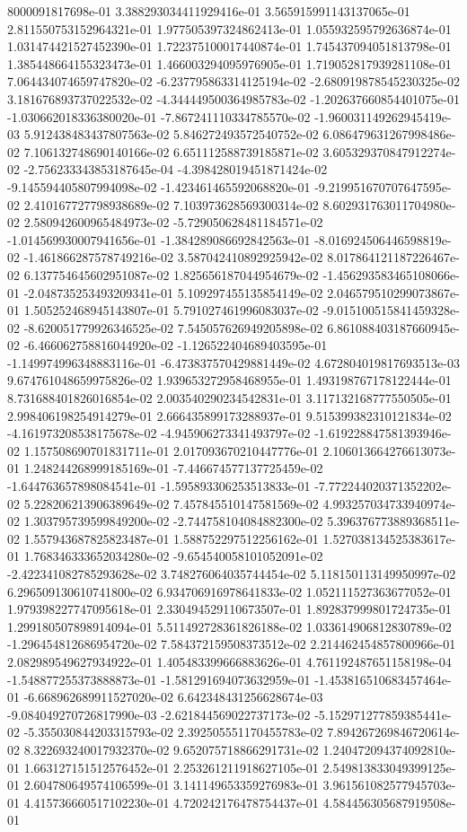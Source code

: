 8000091817698e-01	3.388293034411929416e-01	3.565915991143137065e-01	2.811550753152964321e-01	1.977505397324862413e-01	1.055932595792636874e-01	1.031474421527452390e-01	1.722375100017440874e-01	1.745437094051813798e-01	1.385448664155323473e-01	1.466003294095976905e-01	1.719052817939281108e-01	7.064434074659747820e-02	-6.237795863314125194e-02	-2.680919878545230325e-02	3.181676893737022532e-02	-4.344449500364985783e-02	-1.202637660854401075e-01	-1.030662018336380020e-01	-7.867241110334785570e-02	-1.960031149262945419e-03	5.912438483437807563e-02	5.846272493572540752e-02	6.086479631267998486e-02	7.106132748690140166e-02	6.651112588739185871e-02	3.605329370847912274e-02	-2.756233343853187645e-04	-4.398428019451871424e-02	-9.145594405807994098e-02	-1.423461465592068820e-01	-9.219951670707647595e-02	2.410167727798938689e-02	7.103973628569300314e-02	8.602931763011704980e-02	2.580942600965484973e-02	-5.729050628481184571e-02	-1.014569930007941656e-01	-1.384289086692842563e-01	-8.016924506446598819e-02	-1.461866287578749216e-02	3.587042410892925942e-02	8.017864121187226467e-02	6.137754645602951087e-02	1.825656187044954679e-02	-1.456293583465108066e-01	-2.048735253493209341e-01	5.109297455135854149e-02	2.046579510299073867e-01	1.505252468945143807e-01	5.791027461996083037e-02	-9.015100515841459328e-02	-8.620051779926346525e-02	7.545057626949205898e-02	6.861088403187660945e-02	-6.466062758816044920e-02	-1.126522404689403595e-01	-1.149974996348883116e-01	-6.473837570429881449e-02	4.672804019817693513e-03	9.674761048659975826e-02	1.939653272958468955e-01	1.493198767178122444e-01	8.731688401826016854e-02	2.003540290234542831e-01	3.117132168777550505e-01	2.998406198254914279e-01	2.666435899173288937e-01	9.515399382310121834e-02	-4.161973208538175678e-02	-4.945906273341493797e-02	-1.619228847581393946e-02	1.157508690701831711e-01	2.017093670210447776e-01	2.106013664276613073e-01	1.248244268999185169e-01	-7.446674577137725459e-02	-1.644763657898084541e-01	-1.595893306253513833e-01	-7.772244020371352202e-02	5.228206213906389649e-02	7.457845510147581569e-02	4.993257034733940974e-02	1.303795739599849200e-02	-2.744758104084882300e-02	5.396376773889368511e-02	1.557943687825823487e-01	1.588752297512256162e-01	1.527038134525383617e-01	1.768346333652034280e-02	-9.654540058101052091e-02	-2.422341082785293628e-02	3.748276064035744454e-02	5.118150113149950997e-02	6.296509130610741800e-02	6.934706916978641833e-02	1.052111527363677052e-01	1.979398227747095618e-01	2.330494529110673507e-01	1.892837999801724735e-01	1.299180507898914094e-01	5.511492728361826188e-02	1.033614906812830789e-02	-1.296454812686954720e-02	7.584372159508373512e-02	2.214462454857800966e-01	2.082989549627934922e-01	1.405483399666883626e-01	4.761192487651158198e-04	-1.548877255373888873e-01	-1.581291694073632959e-01	-1.453816510683457464e-01	-6.668962689911527020e-02	6.642348431256628674e-03	-9.084049270726817990e-03	-2.621844569022737173e-02	-5.152971277859385441e-02	-5.355030844203315793e-02	2.392505551170455783e-02	7.894267269846720614e-02	8.322693240017932370e-02	9.652075718866291731e-02	1.240472094374092810e-01	1.663127151512576452e-01	2.253261211918627105e-01	2.549813833049399125e-01	2.604780649574106599e-01	3.141149653359276983e-01	3.961561082577945703e-01	4.415736660517102230e-01	4.720242176478754437e-01	4.584456305687919508e-01